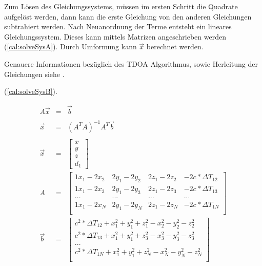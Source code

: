 Zum Lösen des Gleichungssystems, müssen im ersten Schritt die Quadrate aufgelöst werden, dann kann die erste Gleichung von den anderen Gleichungen subtrahiert werden. Nach Neuanordnung der Terme entsteht ein lineares Gleichungssystem. Dieses kann mittels Matrizen angeschrieben werden (\ref{cal:solveSysA}). Durch Umformung kann $\vec{x}$ berechnet werden.

Genauere Informationen bezüglich des TDOA Algorithmus, sowie Herleitung der Gleichungen siehe \cite{TDOF}.

(\ref{cal:solveSysB}).

\begin{eqnarray}
	\label{cal:solveSysA}
	A\vec{x} &=& \vec{b} \\
	\nonumber \\
	\label{cal:solveSysB}
	\vec{x} &=& (A^T A)^{-1} A^T \vec{b} \\
	\nonumber \\
	\vec{x} &=&
	\begin{bmatrix} 
	x\\
	y\\
	z\\
	d_1
	\end{bmatrix}
	\nonumber \\
	A &=&
	\begin{bmatrix} 
	1x_1-2x_2 & 2y_1-2y_2 & 2z_1-2z_2 & -2c*\Delta T_{12} \\
	1x_1-2x_3 & 2y_1-2y_3 & 2z_1-2z_3 & -2c*\Delta T_{13} \\
	... & ... & ... & ... \\
	1x_1-2x_N & 2y_1-2y_N & 2z_1-2z_N & -2c*\Delta T_{1N} \\ 
	\end{bmatrix}
	\nonumber \\
	\vec{b} &=&
	\begin{bmatrix} 
	c^2 * \Delta T_{12} + x^2_1 + y^2_1 + z^2_1 - x^2_2 - y^2_2 - z^2_2  \\
	c^2 * \Delta T_{13} + x^2_1 + y^2_1 + z^2_3 - x^2_3 - y^2_3 - z^2_3  \\
	...  \\
	c^2 * \Delta T_{1N} + x^2_1 + y^2_1 + z^2_N - x^2_N - y^2_N - z^2_N  \\ 
	\end{bmatrix}
	\nonumber
\end{eqnarray}